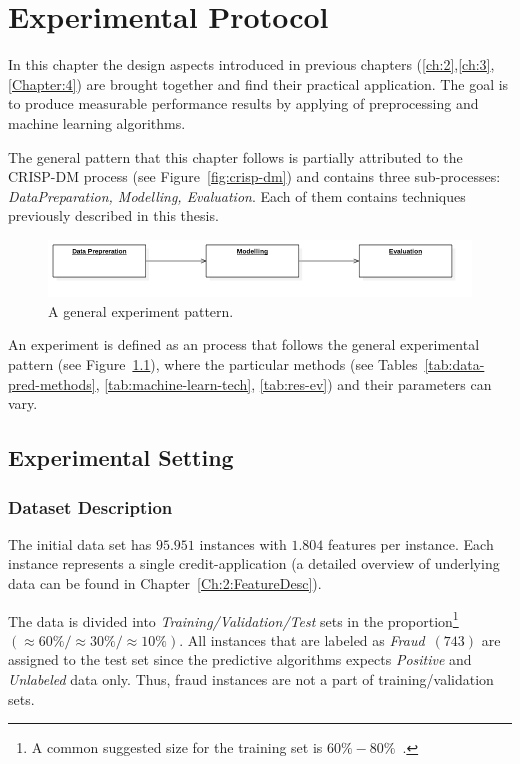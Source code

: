 \chapter{Experimental Protocol}\label{Chapter:5}

In this chapter the design aspects introduced in previous chapters (\ref{ch:2},\ref{ch:3},\ref{Chapter:4}) are brought together and find their practical application. The goal is to produce measurable performance results by applying of preprocessing and machine learning algorithms.

The general pattern that this chapter follows is partially attributed to the CRISP-DM process (see Figure~\ref{fig:crisp-dm}) and contains three sub-processes: \textit{DataPreparation, Modelling, Evaluation}. Each of them contains techniques previously described in this thesis. 

\begin{figure}[h!]
    \centering
    \includegraphics[scale=0.5]{Graphics/DeploymentDiagram1.png}
    \caption{A general experiment pattern.} %
    \label{fig:dep-dia}
\end{figure}

An experiment is defined as an process that follows the general experimental pattern (see Figure~\ref{fig:dep-dia}), where the particular methods (see Tables~\ref{tab:data-pred-methods}, \ref{tab:machine-learn-tech}, \ref{tab:res-ev}) and their parameters can vary.

\section{Experimental Setting} \label{ch:5:ES}

\subsection{Dataset Description}

The initial data set has \(95.951\) instances with \(1.804\) features per instance. Each instance represents a single credit-application (a detailed overview of underlying data can be found in Chapter~\ref{Ch:2:FeatureDesc}). 

The data is divided into \textit{Training/Validation/Test} sets in the proportion\footnote{A common suggested size for the training set is $60\%-80\%$~\cite{UBHD65918158}.} \((\approx60\%/\approx30\%/\approx10\%)\). All instances that are labeled as \textit{Fraud}~\((743)\) are assigned to the test set since the predictive algorithms expects \textit{Positive} and \textit{Unlabeled} data only. Thus, fraud instances are not a part of training/validation sets.

